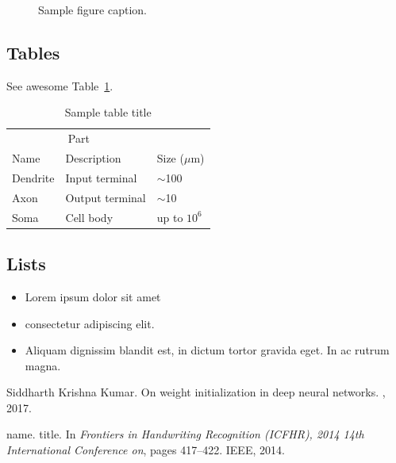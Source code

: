 \documentclass{article}
\begin{document}
\begin{figure}
  \centering
  \fbox{\rule[-.5cm]{4cm}{4cm} \rule[-.5cm]{4cm}{0cm}}
  \caption{Sample figure caption.}
  \label{fig:fig1}
\end{figure}

\subsection{Tables}
\lipsum[12]
See awesome Table~\ref{tab:table}.

\begin{table}
 \caption{Sample table title}
  \centering
  \begin{tabular}{lll}
    \toprule
    \multicolumn{2}{c}{Part}                   \\
    \cmidrule(r){1-2}
    Name     & Description     & Size ($\mu$m) \\
    \midrule
    Dendrite & Input terminal  & $\sim$100     \\
    Axon     & Output terminal & $\sim$10      \\
    Soma     & Cell body       & up to $10^6$  \\
    \bottomrule
  \end{tabular}
  \label{tab:table}
\end{table}

\subsection{Lists}
\begin{itemize}
\item Lorem ipsum dolor sit amet
\item consectetur adipiscing elit. 
\item Aliquam dignissim blandit est, in dictum tortor gravida eget. In ac rutrum magna.
\end{itemize}


  


\begin{thebibliography}{1}

Siddharth Krishna Kumar.
\newblock On weight initialization in deep neural networks.
, 2017.

name.
\newblock title.
\newblock In {\em Frontiers in Handwriting Recognition (ICFHR), 2014 14th
  International Conference on}, pages 417--422. IEEE, 2014.

\end{thebibliography}
\end{document}

